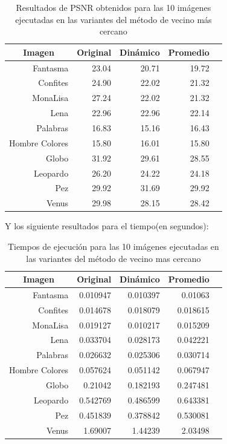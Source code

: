 \documentclass[a4paper]{article}
\newcounter{col}
\begin{document}
\begin{table}[H]
\centering
\begin{tabular}{|r|r|r|r|r|}
\hline
\multicolumn{1}{|c|}{Imagen} & \multicolumn{1}{c|}{Original} & \multicolumn{1}{c|}{Dinámico} & \multicolumn{1}{c|}{Promedio} \\ \hline
Fantasma & 23.04 & 20.71 & 19.72\\ \hline
Confites & 24.90 &  22.02 & 21.32 \\ \hline
MonaLisa &27.24 &  22.02 & 21.32  \\ \hline
Lena & 22.96 &22.96 & 22.14\\ \hline
Palabras & 16.83 &  15.16 & 16.43 \\ \hline
Hombre Colores & 15.80 & 16.01 & 15.80  \\ \hline
Globo & 31.92 &  29.61 & 28.55 \\ \hline
Leopardo & 26.20 &  24.22 & 24.18 \\ \hline
Pez & 29.92 &  31.69 & 29.92  \\ \hline
Venus  & 29.98 &  28.15 & 28.42 \\ \hline
\end{tabular}
\caption{Resultados de PSNR obtenidos para las 10 im\'agenes ejecutadas en las variantes del m\'etodo de vecino m\'as cercano}
\label{}
\end{table}


Y los siguiente resultados para el tiempo(en segundos):\\
\begin{table}[H]
\centering
\begin{tabular}{|r|r|r|r|r|}
\hline
\multicolumn{1}{|c|}{Imagen} & \multicolumn{1}{c|}{Original} & \multicolumn{1}{c|}{Dinámico} & \multicolumn{1}{c|}{Promedio} \\ \hline
Fantasma & 0.010947 & 0.010397 & 0.01063\\ \hline
Confites & 0.014678 &  0.018079 & 0.018615 \\ \hline
MonaLisa &0.019127 &  0.010217 & 0.015209  \\ \hline
Lena & 0.033704 & 0.028173 & 0.042221 \\ \hline
Palabras & 0.026632 &  0.025306 & 0.030714 \\ \hline
Hombre Colores & 0.057624& 0.051142 & 0.067947 \\ \hline
Globo & 0.21042 &  0.182193 & 0.247481 \\ \hline
Leopardo & 0.542769 &  0.486599 & 0.643381\\ \hline
Pez & 0.451839 & 0.378842 & 0.530081  \\ \hline
Venus  & 1.69007 &  1.44239 & 2.03498 \\ \hline
\end{tabular}
\caption{Tiempos de ejecución para las 10 im\'agenes ejecutadas en las variantes del m\'etodo de vecino mas cercano}
\label{tiemposk3}
\end{table}
\end{document}
